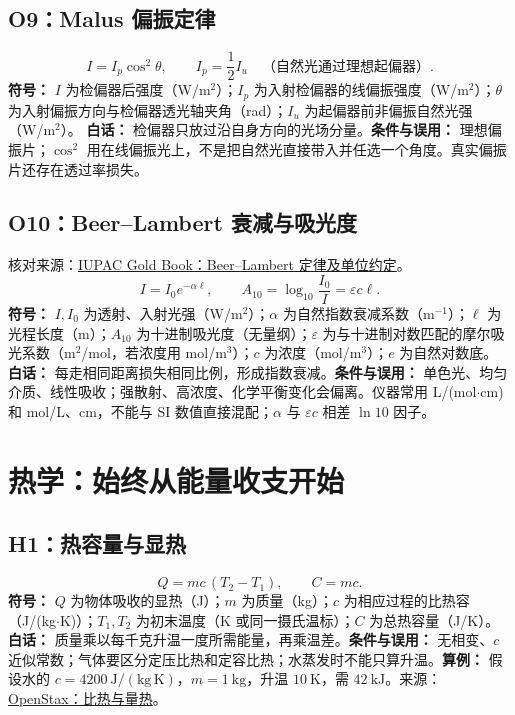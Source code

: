 \documentclass[UTF8,zihao=-4,openany,oneside,fontset=windows]{ctexbook}
\begin{document}
\subsection{O9：Malus 偏振定律}
\begin{equation}
I=I_p\cos^2\theta,\qquad I_p=\frac12I_u\quad\text{（自然光通过理想起偏器）}.
\end{equation}
\textbf{符号：} $I$ 为检偏器后强度（W/m$^2$）；$I_p$ 为入射检偏器的线偏振强度（W/m$^2$）；$\theta$ 为入射偏振方向与检偏器透光轴夹角（rad）；$I_u$ 为起偏器前非偏振自然光强（W/m$^2$）。
\textbf{白话：} 检偏器只放过沿自身方向的光场分量。\textbf{条件与误用：} 理想偏振片；$\cos^2$ 用在线偏振光上，不是把自然光直接带入并任选一个角度。真实偏振片还存在透过率损失。

\subsection{O10：Beer--Lambert 衰减与吸光度}
核对来源：\href{https://goldbook.iupac.org/terms/view/B00626}{IUPAC Gold Book：Beer--Lambert 定律及单位约定}。
\begin{equation}
I=I_0e^{-\alpha\ell},\qquad A_{10}=\log_{10}\frac{I_0}{I}=\varepsilon c\ell.
\end{equation}
\textbf{符号：} $I,I_0$ 为透射、入射光强（W/m$^2$）；$\alpha$ 为自然指数衰减系数（m$^{-1}$）；$\ell$ 为光程长度（m）；$A_{10}$ 为十进制吸光度（无量纲）；$\varepsilon$ 为与十进制对数匹配的摩尔吸光系数（m$^2$/mol，若浓度用 mol/m$^3$）；$c$ 为浓度（mol/m$^3$）；$e$ 为自然对数底。
\textbf{白话：} 每走相同距离损失相同比例，形成指数衰减。\textbf{条件与误用：} 单色光、均匀介质、线性吸收；强散射、高浓度、化学平衡变化会偏离。仪器常用 L/(mol$\cdot$cm) 和 mol/L、cm，不能与 SI 数值直接混配；$\alpha$ 与 $\varepsilon c$ 相差 $\ln10$ 因子。

\section{热学：始终从能量收支开始}
\subsection{H1：热容量与显热}
\begin{equation}
Q=mc\,(T_2-T_1),\qquad C=mc.
\end{equation}
\textbf{符号：} $Q$ 为物体吸收的显热（J）；$m$ 为质量（kg）；$c$ 为相应过程的比热容（J/(kg$\cdot$K)）；$T_1,T_2$ 为初末温度（K 或同一摄氏温标）；$C$ 为总热容量（J/K）。
\textbf{白话：} 质量乘以每千克升温一度所需能量，再乘温差。\textbf{条件与误用：} 无相变、$c$ 近似常数；气体要区分定压比热和定容比热；水蒸发时不能只算升温。\textbf{算例：} 假设水的 $c=4200\ \mathrm{J/(kg\,K)}$，$m=1\ \mathrm{kg}$，升温 $10\ \mathrm K$，需 $42\ \mathrm{kJ}$。来源：\href{https://openstax.org/books/university-physics-volume-2/pages/1-4-heat-transfer-specific-heat-and-calorimetry}{OpenStax：比热与量热}。
\end{document}

